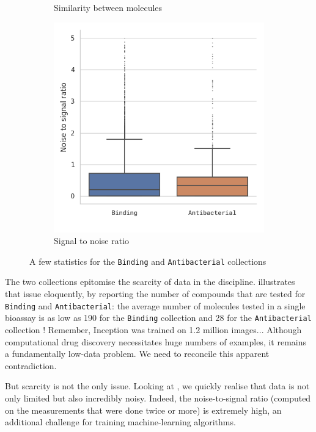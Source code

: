 \documentclass[11pt]{article}
\numberwithin{equation}{subsection}
\begin{document}
\begin{figure}[ht]
{\begin{subfigure}[t]{.49\textwidth}
      \caption{Similarity between molecules}
      \label{fig:dataset-description-similarity}
    \end{subfigure}
    \hfill
    \begin{subfigure}[t]{.38\textwidth}
      \includegraphics[width=1\textwidth,center]{datasets/snr}
      \caption{Signal to noise ratio}
      \label{fig:dataset-description-snr}
    \end{subfigure}
  }
  \caption{A few statistics for the \texttt{Binding} and \texttt{Antibacterial} collections}
  \label{fig:dataset-description}
\end{figure}

The two collections epitomise the scarcity of data in the discipline.  illustrates that issue eloquently, by reporting the number of compounds that are tested for  \texttt{Binding} and \texttt{Antibacterial}: the average number of molecules tested in a single bioassay is as low as 190 for the \texttt{Binding} collection and 28 for the \texttt{Antibacterial} collection ! Remember, Inception \citep{inception} was trained on 1.2 million images... Although computational drug discovery necessitates huge numbers of examples, it remains a fundamentally low-data problem. We need to reconcile this apparent contradiction.

But scarcity is not the only issue. Looking at , we quickly realise that data is not only limited but also incredibly noisy. Indeed, the noise-to-signal ratio (computed on the measurements that were done twice or more) is extremely high, an additional challenge for training machine-learning algorithms.
\end{document}
